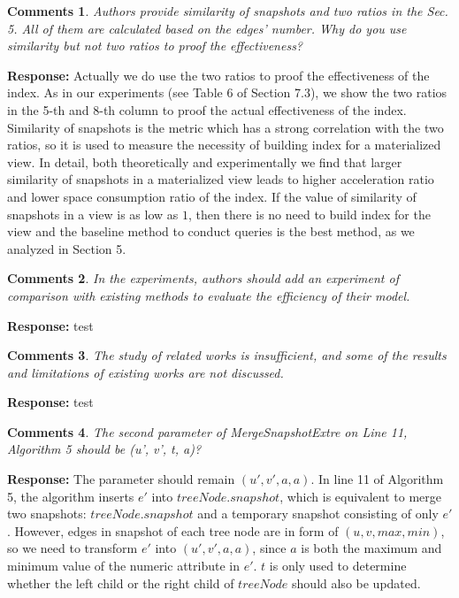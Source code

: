 \documentclass{article}
\newtheorem{Comments}{\textbf{Comments}}
\begin{document}
\begin{Comments}
Authors provide similarity of snapshots and two ratios in the Sec. 5. All of them are calculated based on the edges’ number. Why do you use similarity but not two ratios to proof the effectiveness?
\end{Comments}
\noindent \textbf{Response:} Actually we do use the two ratios to proof the effectiveness of the index. As in our experiments (see Table 6 of Section 7.3), we show the two ratios in the 5-th and 8-th column to proof the actual effectiveness of the index. Similarity of snapshots is the metric which has a strong correlation with the two ratios, so it is used to measure the necessity of building index for a materialized view. In detail, both theoretically and experimentally we find that larger similarity of snapshots in a materialized view leads to higher acceleration ratio and lower space consumption ratio of the index. If the value of similarity of snapshots in a view is as low as $ 1 $, then there is no need to build index for the view and the baseline method to conduct queries is the best method, as we analyzed in Section 5.

\begin{Comments}
In the experiments, authors should add an experiment of comparison with existing methods to evaluate the efficiency of their model.
\end{Comments}
\noindent \textbf{Response:} test

\begin{Comments}
The study of related works is insufficient, and some of the results and limitations of existing works are not discussed.
\end{Comments}
\noindent \textbf{Response:} test

\begin{Comments}
The second parameter of MergeSnapshotExtre on Line 11, Algorithm 5 should be (u’, v’, t, a)?
\end{Comments}
\noindent \textbf{Response:} The parameter should remain $ (u',v',a,a) $. In line 11 of Algorithm 5, the algorithm inserts $ e' $ into $ treeNode.snapshot $, which is equivalent to merge two snapshots: $ treeNode.snapshot $ and a temporary snapshot consisting of only $ e' $. However, edges in snapshot of each tree node are in form of $ (u,v,max,min) $, so we need to transform $ e' $ into $ (u',v',a,a) $, since $ a $ is both the maximum and minimum value of the numeric attribute in $ e' $. $ t $ is only used to determine whether the left child or the right child of $ treeNode $ should also be updated.
\end{document}

